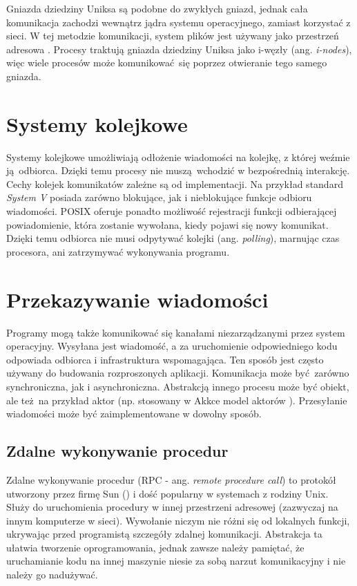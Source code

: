 Gniazda dziedziny Uniksa są podobne do zwykłych gniazd, jednak cała komunikacja zachodzi wewnątrz jądra systemu operacyjnego, zamiast korzystać z sieci. W tej metodzie komunikacji, system plików jest używany jako przestrzeń adresowa \cite{unix_sock}. Procesy traktują gniazda dziedziny Uniksa jako i-węzły (ang. \textit{i-nodes}), więc wiele procesów może komunikować się poprzez otwieranie tego samego gniazda.


\section{Systemy kolejkowe}

Systemy kolejkowe umożliwiają odłożenie wiadomości na kolejkę, z której weźmie ją odbiorca. Dzięki temu procesy nie muszą wchodzić w bezpośrednią interakcję. Cechy kolejek komunikatów zależne są od implementacji. Na przykład standard \textit{System V} posiada zarówno blokujące, jak i nieblokujące funkcje odbioru wiadomości. POSIX oferuje ponadto możliwość rejestracji funkcji odbierającej powiadomienie, która zostanie wywołana, kiedy pojawi się nowy komunikat. Dzięki temu odbiorca nie musi odpytywać kolejki (ang. \textit{polling}), marnując czas procesora, ani zatrzymywać wykonywania programu.


\section{Przekazywanie wiadomości}

Programy mogą także komunikować się kanałami niezarządzanymi przez system operacyjny. Wysyłana jest wiadomość, a za uruchomienie odpowiedniego kodu odpowiada odbiorca i infrastruktura wspomagająca. Ten sposób jest często używany do budowania rozproszonych aplikacji. Komunikacja może być zarówno synchroniczna, jak i asynchroniczna. Abstrakcją innego procesu może być obiekt, ale też na przykład aktor (np. stosowany w Akkce model aktorów \cite{akka}). Przesyłanie wiadomości może być zaimplementowane w dowolny sposób.


\subsection{Zdalne wykonywanie procedur}

Zdalne wykonywanie procedur (RPC - ang. \textit{remote procedure call}) to protokół utworzony przez firmę Sun (\cite{rpc}) i dość popularny w systemach z rodziny Unix. Służy do uruchomienia procedury w innej przestrzeni adresowej (zazwyczaj na innym komputerze w sieci). Wywołanie niczym nie różni się od lokalnych funkcji, ukrywając przed programistą szczegóły zdalnej komunikacji. Abstrakcja ta ułatwia tworzenie oprogramowania, jednak zawsze należy pamiętać, że uruchamianie kodu na innej maszynie niesie za sobą narzut komunikacyjny i nie należy go nadużywać.


